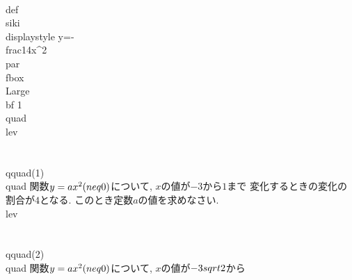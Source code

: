 \\def\\siki{\\displaystyle y=-\\frac{1}{4}x^{2}}
\\par \\fbox{{\\Large\\bf 1}}\\quad 
\\lev\\\\
\\qquad(1)\\quad 関数$y=ax^{2}(\\neq 0)$について, $x$の値が$-3$から$1$まで
変化するときの変化の割合が$4$となる. このとき定数$a$の値を求めなさい.
\\lev\\\\
 \\qquad(2)\\quad 関数$y=ax^{2}(\\neq 0)$について, $x$の値が$-3\\sqrt{2}$から
